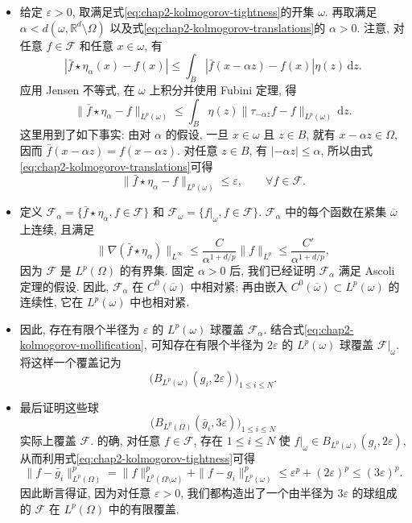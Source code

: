 \begin{Proof}
\begin{itemize}
\item 给定 $\varepsilon>0$, 取满足式\eqref{eq:chap2-kolmogorov-tightness}的开集 $\omega$. 再取满足 $\alpha<d(\omega,\mathbb{R}^d\setminus\Omega)$ 以及式\eqref{eq:chap2-kolmogorov-translations}的 $\alpha>0$. 注意, 对任意 $f\in\mathcal{F}$ 和任意 $x\in\omega$, 有
\[
 |\bar f\star\eta_\alpha(x)-f(x)|
 \leq\int_B|\bar f(x-\alpha z)-f(x)|\eta(z)\,\mathrm{d}z.
\]
应用 Jensen 不等式, 在 $\omega$ 上积分并使用 Fubini 定理, 得
\[
 \|\bar f\star\eta_\alpha-f\|_{L^p(\omega)}
 \leq\int_B\eta(z)\|\tau_{-\alpha z}f-f\|_{L^p(\omega)}\,\mathrm{d}z.
\]
这里用到了如下事实: 由对 $\alpha$ 的假设, 一旦 $x\in\omega$ 且 $z\in B$, 就有 $x-\alpha z\in\Omega$, 因而 $\bar f(x-\alpha z)=f(x-\alpha z)$. 对任意 $z\in B$, 有 $|-\alpha z|\leq\alpha$, 所以由式\eqref{eq:chap2-kolmogorov-translations}可得
\begin{equation}
 \|\bar f\star\eta_\alpha-f\|_{L^p(\omega)}\leq\varepsilon,
 \qquad\forall f\in\mathcal{F}.
 \label{eq:chap2-kolmogorov-mollification}
\end{equation}

\item 定义 $\mathcal{F}_\alpha=\{\bar f\star\eta_\alpha,f\in\mathcal{F}\}$ 和 $\mathcal{F}_\omega=\{f|_\omega,f\in\mathcal{F}\}$. $\mathcal{F}_\alpha$ 中的每个函数在紧集 $\overline\omega$ 上连续, 且满足
\[
 \|\nabla(\bar f\star\eta_\alpha)\|_{L^\infty}
 \leq\frac{C}{\alpha^{1+d/p}}\|f\|_{L^p}
 \leq\frac{C'}{\alpha^{1+d/p}},
\]
因为 $\mathcal{F}$ 是 $L^p(\Omega)$ 的有界集. 固定 $\alpha>0$ 后, 我们已经证明 $\mathcal{F}_\alpha$ 满足 Ascoli 定理的假设. 因此, $\mathcal{F}_\alpha$ 在 $C^0(\overline\omega)$ 中相对紧; 再由嵌入 $C^0(\overline\omega)\subset L^p(\omega)$ 的连续性, 它在 $L^p(\omega)$ 中也相对紧.

\item 因此, 存在有限个半径为 $\varepsilon$ 的 $L^p(\omega)$ 球覆盖 $\mathcal{F}_\alpha$. 结合式\eqref{eq:chap2-kolmogorov-mollification}, 可知存在有限个半径为 $2\varepsilon$ 的 $L^p(\omega)$ 球覆盖 $\mathcal{F}|_\omega$. 将这样一个覆盖记为
\[
 \bigl(B_{L^p(\omega)}(g_i,2\varepsilon)\bigr)_{1\leq i\leq N}.
\]

\item 最后证明这些球
\[
 \bigl(B_{L^p(\Omega)}(\bar g_i,3\varepsilon)\bigr)_{1\leq i\leq N}
\]
实际上覆盖 $\mathcal{F}$. 的确, 对任意 $f\in\mathcal{F}$, 存在 $1\leq i\leq N$ 使 $f|_\omega\in B_{L^p(\omega)}(g_i,2\varepsilon)$, 从而利用式\eqref{eq:chap2-kolmogorov-tightness}可得
\[
 \|f-\bar g_i\|_{L^p(\Omega)}^p
 =\|f\|_{L^p(\Omega\setminus\omega)}^p+
 \|f-g_i\|_{L^p(\omega)}^p
 \leq\varepsilon^p+(2\varepsilon)^p\leq(3\varepsilon)^p.
\]
因此断言得证, 因为对任意 $\varepsilon>0$, 我们都构造出了一个由半径为 $3\varepsilon$ 的球组成的 $\mathcal{F}$ 在 $L^p(\Omega)$ 中的有限覆盖.
\end{itemize}
\end{Proof}

